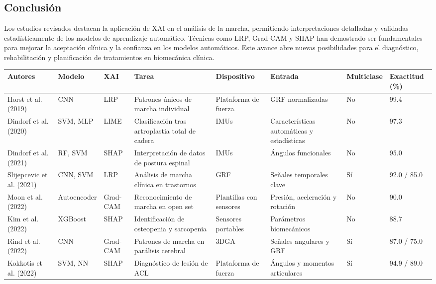 \documentclass{report}
\begin{document}
\subsection{Conclusión}
Los estudios revisados destacan la aplicación de XAI en el análisis de la marcha, permitiendo interpretaciones detalladas y validadas estadísticamente de los modelos de aprendizaje automático. Técnicas como LRP, Grad-CAM y SHAP han demostrado ser fundamentales para mejorar la aceptación clínica y la confianza en los modelos automáticos. Este avance abre nuevas posibilidades para el diagnóstico, rehabilitación y planificación de tratamientos en biomecánica clínica.

\newpage



\begin{table}[ht]
    \footnotesize
    \centering
    \begin{tabular}{@{}p{1.5cm}p{2cm}p{1.5cm}p{3cm}p{2cm}p{2.5cm}p{1.5cm}p{2.5cm}}
    \toprule
    \textbf{Autores} & \textbf{Modelo} & \textbf{XAI} & \textbf{Tarea} & \textbf{Dispositivo} & \textbf{Entrada} & \textbf{Multiclase} & \textbf{Exactitud (\%)} \\
    \midrule
    Horst et al. (2019) & CNN & LRP & Patrones únicos de marcha individual & Plataforma de fuerza & GRF normalizadas & No & 99.4 \\
    Dindorf et al. (2020) & SVM, MLP & LIME & Clasificación tras artroplastia total de cadera & IMUs & Características automáticas y estadísticas & No & 97.3 \\
    Dindorf et al. (2021) & RF, SVM & SHAP & Interpretación de datos de postura espinal & IMUs & Ángulos funcionales & No & 95.0 \\
    Slijepcevic et al. (2021) & CNN, SVM & LRP & Análisis de marcha clínica en trastornos & GRF & Señales temporales clave & Sí & 92.0 / 85.0 \\
    Moon et al. (2022) & Autoencoder & Grad-CAM & Reconocimiento de marcha en open set & Plantillas con sensores & Presión, aceleración y rotación & No & 90.0 \\
    Kim et al. (2022) & XGBoost & SHAP & Identificación de osteopenia y sarcopenia & Sensores portables & Parámetros biomecánicos & No & 88.7 \\
    Rind et al. (2022) & CNN & Grad-CAM & Patrones de marcha en parálisis cerebral & 3DGA & Señales angulares y GRF & Sí & 87.0 / 75.0 \\
    Kokkotis et al. (2022) & SVM, NN & SHAP & Diagnóstico de lesión de ACL & Plataforma de fuerza & Ángulos y momentos articulares & Sí & 94.9 / 89.0 \\

\end{tabular}
\end{table}
\end{document}
